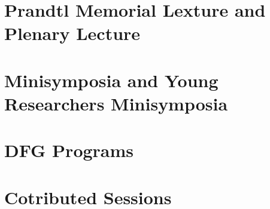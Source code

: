 \documentclass[colorlinks]{gamm-boa}
\begin{document}
 \tableofcontents

{\color{primary}\chapter{Prandtl Memorial Lexture and Plenary Lecture}}








{\color{primary}\chapter{Minisymposia and Young Researchers Minisymposia}}









{\color{primary}\chapter{DFG Programs}}





{\color{primary}\chapter{Cotributed Sessions}}


























\end{document}
